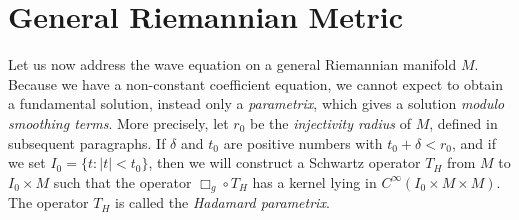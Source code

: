 %
%
%
%
%
%
%
%
%
%
%
%

\section{General Riemannian Metric}

Let us now address the wave equation on a general Riemannian manifold $M$. Because we have a non-constant coefficient equation, we cannot expect to obtain a fundamental solution, instead only a \emph{parametrix}, which gives a solution \emph{modulo smoothing terms}. More precisely, let $r_0$ be the \emph{injectivity radius} of $M$, defined in subsequent paragraphs. If $\delta$ and $t_0$ are positive numbers with $t_0 + \delta < r_0$, and if we set $I_0 = \{ t : |t| < t_0 \}$, then we will construct a Schwartz operator $T_H$ from $M$ to $I_0 \times M$ such that the operator $\Box_g \circ T_H$ has a kernel lying in $C^\infty(I_0 \times M \times M)$. The operator $T_H$ is called the \emph{Hadamard parametrix}.

